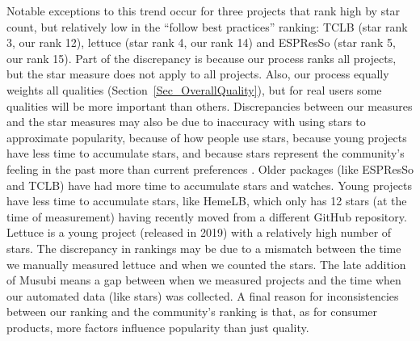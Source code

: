 \documentclass[final, 3p, times, authoryear]{elsarticle}
\newcommand{\esp}{ESPResSo\nolinebreak\hspace{-.05em}\raisebox{.4ex}{\small\bf
+}\nolinebreak\hspace{-.10em}\raisebox{.4ex}{\small\bf +}}
\begin{document}
Notable exceptions to this trend occur for three projects that rank high by star
count, but relatively low in the ``follow best practices'' ranking: TCLB (star
rank 3, our rank 12), lettuce (star rank 4, our rank 14) and \esp{} (star rank
5, our rank 15).  Part of the discrepancy is because our process ranks all
projects, but the star measure does not apply to all projects.  Also, our
process equally weights all qualities (Section~\ref{Sec_OverallQuality}), but
for real users some qualities will be more important than others. Discrepancies
between our measures and the star measures may also be due to inaccuracy with
using stars to approximate popularity, because of how people use stars, because
young projects have less time to accumulate stars, and because stars represent
the community's feeling in the past more than current preferences
\citep{Szulik2017}. Older packages (like \esp{} and TCLB) have had more time to
accumulate stars and watches. Young projects have less time to accumulate stars,
like HemeLB, which only has 12 stars (at the time of measurement) having
recently moved from a different GitHub repository.  Lettuce is a young project
(released in 2019) with a relatively high number of stars. The discrepancy in
rankings may be due to a mismatch between the time we manually measured lettuce
and when we counted the stars. The late addition of Musubi means a gap between
when we measured projects and the time when our automated data (like stars) was
collected. A final reason for inconsistencies between our ranking and the
community's ranking is that, as for consumer products, more factors influence
popularity than just quality.
\end{document}
